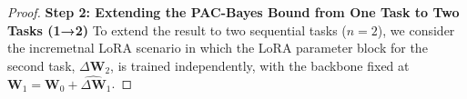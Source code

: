 \documentclass[letterpaper]{article} %
\begin{document}
\begin{proof}












\textbf{Step 2: Extending the PAC-Bayes Bound from One Task to Two Tasks  (1→2)}
To extend the result to two sequential tasks ($n=2$), we consider the incremetnal LoRA scenario in which the LoRA parameter block for the second task, $\Delta\mathbf{W}_2$, is trained independently, with the backbone fixed at $\mathbf{W}_1 = \mathbf{W}_0 + \hat{\Delta\mathbf{W}}_1$. 



\end{proof}
\end{document}

